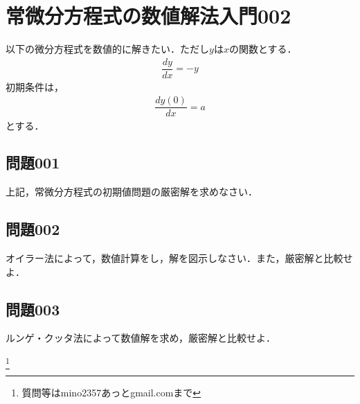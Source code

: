 \documentclass[12pt]{jarticle}
\date{}
\begin{document}

\section*{常微分方程式の数値解法入門002}
以下の微分方程式を数値的に解きたい．ただし$y$は$x$の関数とする．
\begin{align*}
\dfrac{dy}{dx} = -y
\end{align*}
初期条件は，
\begin{align*}
\dfrac{dy(0)}{dx} = a
\end{align*}
とする．
\subsection*{問題001}
上記，常微分方程式の初期値問題の厳密解を求めなさい．
%
\subsection*{問題002}
オイラー法によって，数値計算をし，解を図示しなさい．また，厳密解と比較せよ．
\subsection*{問題003}
ルンゲ・クッタ法によって数値解を求め，厳密解と比較せよ．

\footnote[0]{
質問等はmino2357あっとgmail.comまで
}

\thispagestyle{empty}
\end{document}
